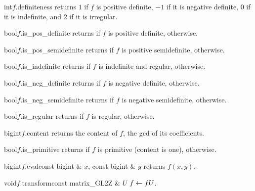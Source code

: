 \begin{cfcode}{int}{$f$.definiteness}{}
  returns $1$ if $f$ is positive definite, $-1$ if it is negative definite, $0$ if it is
  indefinite, and $2$ if it is irregular.
\end{cfcode}

\begin{cfcode}{bool}{$f$.is_pos_definite}{}
  returns \TRUE if $f$ is positive definite, \FALSE otherwise.
\end{cfcode}

\begin{cfcode}{bool}{$f$.is_pos_semidefinite}{}
  returns \TRUE if $f$ is positive semidefinite, \FALSE otherwise.
\end{cfcode}

\begin{cfcode}{bool}{$f$.is_indefinite}{}
  returns \TRUE if $f$ is indefinite and regular, \FALSE otherwise.
\end{cfcode}

\begin{cfcode}{bool}{$f$.is_neg_definite}{}
  returns \TRUE if $f$ is negative definite, \FALSE otherwise.
\end{cfcode}

\begin{cfcode}{bool}{$f$.is_neg_semidefinite}{}
  returns \TRUE if $f$ is negative semidefinite, \FALSE otherwise.
\end{cfcode}

\begin{cfcode}{bool}{$f$.is_regular}{}
  returns \TRUE if $f$ is regular, \FALSE otherwise.
\end{cfcode}

\begin{cfcode}{bigint}{$f$.content}{}
  returns the content of $f$, the gcd of its coefficients.
\end{cfcode}

\begin{cfcode}{bool}{$f$.is_primitive}{}
  returns \TRUE if $f$ is primitive (content is one), \FALSE otherwise.
\end{cfcode}

\begin{cfcode}{bigint}{$f$.eval}{const bigint & $x$, const bigint & $y$}
  returns $f(x, y)$.
\end{cfcode}

\begin{fcode}{void}{$f$.transform}{const matrix_GL2Z & $U$}
  $f \leftarrow fU$.
\end{fcode}

